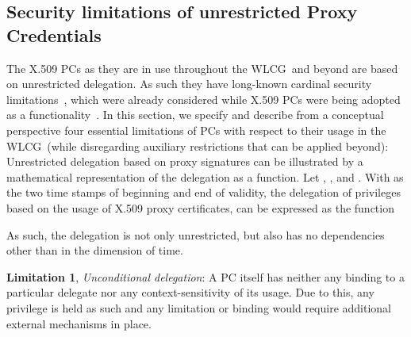 \documentclass[10pt]{iopart}
\newcommand{\wlcg}{WLCG}
\begin{document}
\subsection{Security limitations of unrestricted Proxy Credentials}
\label{proxies}
The X.509 PCs as they are
in use throughout the \wlcg\ and beyond are based on unrestricted delegation.
As such they have long-known cardinal security limitations~\cite{proxy}, which
were already considered while X.509 PCs were being adopted as a functionality~\cite{x509delegation}.
In this section, we specify and describe from a 
conceptual perspective four
essential limitations of PCs
with respect to their usage
in the \wlcg\ (while disregarding auxiliary restrictions that can be 
applied beyond):\\ Unrestricted delegation based on proxy
signatures can be illustrated by a mathematical representation of
the delegation as a function.
Let
,
,
and .
With  
 as the two time stamps of beginning and
end of validity, the delegation of
privileges based on the usage of X.509 proxy certificates, can be expressed as the function
\begin{center}

\end{center}
As such, the delegation is not only unrestricted, but also has
no dependencies other than in the dimension of time.\\
\par
\begingroup
\leftskip=0.4cm
\noindent
\textbf{Limitation 1}, \textit{Unconditional delegation}:
A PC itself has neither any binding to a particular delegate nor any
context-sensitivity of its usage. Due to this, any privilege is held as
such and any limitation or binding would require additional external mechanisms in
place.\\
\end{document}
